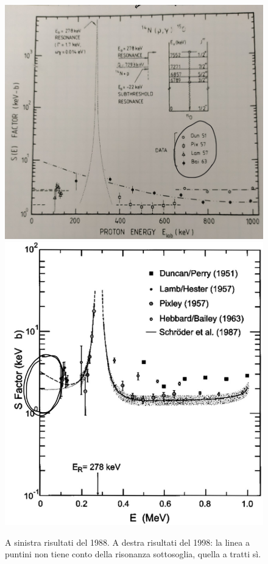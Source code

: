 \begin{figure}[h]
	\centering
	\includegraphics[scale=0.5]{Immagini/0422_Se.png}
	\includegraphics[scale=0.5]{Immagini/0422_Se2.png}
	\caption{A sinistra risultati del 1988.
	A destra risultati del 1998: la linea a puntini non tiene conto della risonanza sottosoglia, quella a tratti sì.}
	\label{0422_19881998}
\end{figure}

